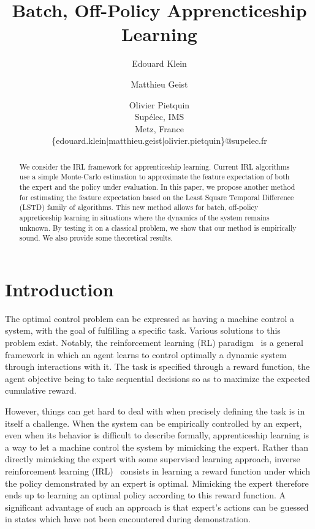 \documentclass{article}
\title{Batch, Off-Policy Apprencticeship Learning}
\author{Edouard Klein \and Matthieu Geist \and Olivier Pietquin \\
Supélec, IMS\\
Metz, France \\
\{edouard.klein$|$matthieu.geist$|$olivier.pietquin\}@supelec.fr}
\begin{document}
\maketitle
\begin{abstract}
We consider the IRL framework for apprenticeship learning. %
Current IRL algorithms use a simple Monte-Carlo estimation to approximate the feature expectation of both the expert and the policy under evaluation. %
In this paper, we propose another method for estimating the feature expectation based on the Least Square Temporal Difference (LSTD) family of algorithms. %
This new method allows for batch, off-policy appreticeship learning in situations where the dynamics of the system remains unknown. %
By testing it on a classical problem, we show that our method is empirically sound.%
We also provide some theoretical results.%
\end{abstract}
\section{Introduction}
The optimal control problem can be expressed as having a machine
control a system, with the goal of fulfilling a specific task.
Various solutions to this problem exist. Notably, the reinforcement
learning (RL) paradigm~\citep{sutton1998reinforcement} is a general framework in
which an agent learns to control optimally a dynamic system through
interactions with it. The task is specified through a reward
function, the agent objective being to take sequential decisions so
as to maximize the expected cumulative reward.

However, things can get hard to deal with  when precisely defining
the task is in itself a challenge. When the system can be
empirically controlled by an expert, even when its behavior is
difficult to describe formally, apprenticeship learning is a way to
let a machine control the system by mimicking the expert. Rather
than directly mimicking the expert with some supervised learning
approach, inverse reinforcement learning (IRL)~\citep{ng2000algorithms}
consists in learning a reward function under which the policy
demonstrated by an expert is optimal. Mimicking the expert therefore
ends up to learning an optimal policy according to this reward
function. A significant advantage of such an approach is that
expert's actions can be guessed in states which have not been
encountered during demonstration.
\end{document}
